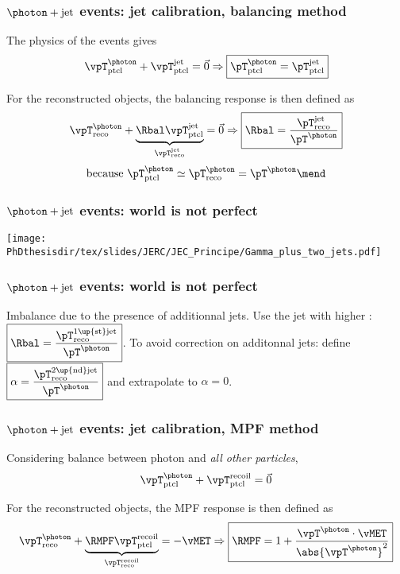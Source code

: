\begin{frame}
\frametitle{$\photon+\text{jet}$ events: jet calibration, balancing method}
\manip The physics of the events gives
\begin{equation*}
\vpT^\photon_\text{ptcl} + \vpT^\text{jet}_\text{ptcl} = \vec{0} \Rightarrow \boxed{{\pT}^\photon_\text{ptcl} = {\pT}^\text{jet}_\text{ptcl}}
\end{equation*}

\pause
\vfill

\manip For the reconstructed objects, the balancing response is then defined as
\begin{equation*}
\vpT^\photon_\text{reco} + \underbrace{\Rbal \vpT^\text{jet}_\text{ptcl}}_{\vpT^\text{jet}_\text{reco}} = \vec{0}
\Rightarrow
\boxed{\Rbal = \frac{{\pT}^\text{jet}_\text{reco}}{\pT^\photon}}
\end{equation*}
\begin{equation*}
\text{because }
\pT^\photon_\text{ptcl}\simeq\pT^\photon_\text{reco}
=\pT^\photon
\mend
\end{equation*}
\end{frame}

\begin{frame}
\frametitle{$\photon+\text{jet}$ events: world is not perfect}
\begin{center}
\texttt{[image: \\PhDthesisdir/tex/slides/JERC/JEC\_Principe/Gamma\_plus\_two\_jets.pdf]}
\end{center}
\end{frame}

\begin{frame}
\frametitle{$\photon+\text{jet}$ events: world is not perfect}
\manip Imbalance due to the presence of additionnal jets.
\pause
\manip Use the jet with higher \pT: $\displaystyle \boxed{\Rbal = \frac{{\pT}^\text{1\up{st}jet}_\text{reco}}{\pT^\photon}}$.
\pause
\manip To avoid correction on additonnal jets: define $\displaystyle \boxed{\alpha = \frac{{\pT}^\text{2\up{nd}jet}_\text{reco}}{\pT^\photon}}$ and extrapolate to $\alpha=0$.
\end{frame}

\begin{frame}
\frametitle{$\photon+\text{jet}$ events: jet calibration, MPF method}
\manip Considering balance between photon and \emph{all other particles},
\begin{equation*}
\vpT^\photon_\text{ptcl} + \vpT^\text{recoil}_\text{ptcl} = \vec{0}
\end{equation*}

\pause
\vfill

\manip For the reconstructed objects, the MPF response is then defined as
\begin{equation*}
\vpT^\photon_\text{reco} + \underbrace{\RMPF \vpT^\text{recoil}_\text{ptcl}}_{\vpT^\text{recoil}_\text{reco}} = -\vMET
\Rightarrow
\boxed{\RMPF = 1 + \frac{\vpT^\photon\cdot\vMET}{\abs{\vpT^\photon}^2}}
\end{equation*}
\end{frame}